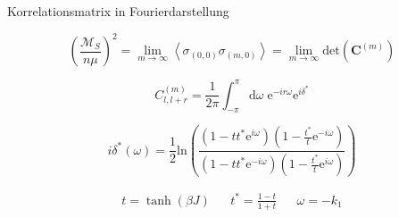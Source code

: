 \documentclass[11pt]{beamer}
\newcommand{\corr}[1]{\left\langle #1 \right\rangle}
\renewcommand{\det}[1]{\mathrm{det}\left( #1 \right)}
\renewcommand{\ln}[1]{\mathrm{ln}\left( #1 \right)}
\renewcommand{\d}[0]{\mathrm{d}}
\begin{document}
    \begin{frame}{Korrelationsmatrix in Fourierdarstellung}

        \begin{equation} \nonumber
            \left(\frac{\mathcal{M}_S}{ n \mu}\right)^2 = \lim_{m \rightarrow \infty} \corr{\sigma_{(0,0)} \sigma_{(m,0)}} = \lim_{m \rightarrow \infty} \det{\bm{C}^{(m)}}
        \end{equation}
    
        \pause 
        
        \begin{grayframe}
            \vspace{0.2cm}
            \begin{equation} \nonumber
                C^{(m)}_{l,l+r} = \frac{1}{2\pi} \int_{-\pi}^{\pi}\d\omega  \;\mathrm{e}^{-i  r \omega} \mathrm{e}^{i\delta^*}
            \end{equation}
        \end{grayframe}   
        
        \vspace{0.5cm}
        
        \pause
        \begin{equation} \nonumber
            i\delta^*(\omega) = \frac{1}{2} \ln{\frac{(1-tt^*\mathrm{e}^{i\omega})(1-\frac{t^*}{t}\mathrm{e}^{-i\omega})}{(1-tt^*\mathrm{e}^{-i\omega})(1-\frac{t^*}{t}\mathrm{e}^{i\omega})}}
        \end{equation}

        \vspace{0.3cm}
        
        \begin{equation}\nonumber
            \begin{array}{ccccc}
                t = \tanh(\beta J) & & t^* = \frac{1-t}{1+t}    & &             \omega = -k_1
            \end{array}
        \end{equation}
    
    \end{frame}
\end{document}
